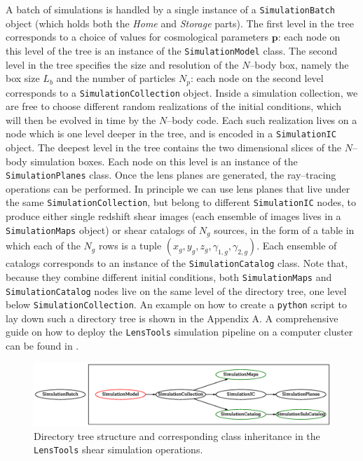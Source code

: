 \documentclass[reprint,aps,prd,superscriptaddress,showkeys,showpacs]{revtex4-1}
\newcommand{\bb}[1]{\mathbf{#1}}
\newcommand{\ttt}[1]{\texttt{#1}}
\newcommand{\LT}{\texttt{LensTools} }
\begin{document}
A batch of simulations is handled by a single instance of a \ttt{SimulationBatch} object (which holds both the \textit{Home} and \textit{Storage} parts). The first level in the tree corresponds to a choice of values for cosmological parameters $\bb{p}$: each node on this level of the tree is an instance of the \ttt{SimulationModel} class. The second level in the tree specifies the size and resolution of the $N$--body box, namely the box size $L_b$ and the number of particles $N_p$: each node on the second level corresponds to a \ttt{SimulationCollection} object. Inside a simulation collection, we are free to choose different random realizations of the initial conditions, which will then be evolved in time by the $N$--body code. Each such realization lives on a node which is one level deeper in the tree, and is encoded in a \ttt{SimulationIC} object. The deepest level in the tree contains the two dimensional slices of the $N$--body simulation boxes. Each node on this level is an instance of the \ttt{SimulationPlanes} class. Once the lens planes are generated, the ray--tracing operations can be performed. In principle we can use lens planes that live under the same \ttt{SimulationCollection}, but belong to different \ttt{SimulationIC} nodes, to produce either single redshift shear images (each ensemble of images lives in a \ttt{SimulationMaps} object) or shear catalogs of $N_g$ sources, in the form of a table in which each of the $N_g$ rows is a tuple $(x_g,y_g,z_g,\gamma_{1,g},\gamma_{2,g})$. Each ensemble of catalogs corresponds to an instance of the \ttt{SimulationCatalog} class. Note that, because they combine different initial conditions, both \ttt{SimulationMaps} and \ttt{SimulationCatalog} nodes live on the same level of the directory tree, one level below \ttt{SimulationCollection}. An example on how to create a \ttt{python} script to lay down such a directory tree is shown in the Appendix A. A comprehensive guide on how to deploy the \LT simulation pipeline on a computer cluster can be found in \citep{lenstoolsdocs}.      

\begin{figure}
\includegraphics[scale=0.6]{Figures/inheritance.eps}
\caption{Directory tree structure and corresponding class inheritance in the \LT shear simulation operations.}
\label{inheritance}
\end{figure}
\end{document}
